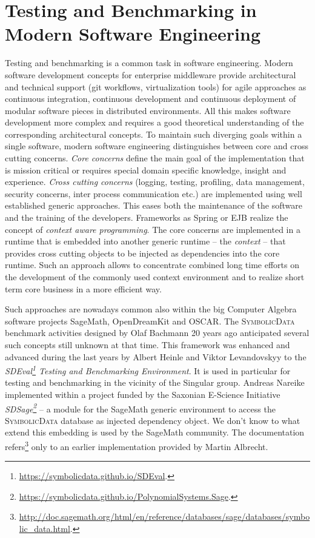 \documentclass[a4paper,11pt]{article}
\def\SD{\textsc{SymbolicData}}
\begin{document}
\section{Testing and Benchmarking in Modern Software Engineering}

Testing and benchmarking is a common task in software engineering. Modern
software development concepts for enterprise middleware provide architectural
and technical support (git workflows, virtualization tools) for agile
approaches as continuous integration, continuous development and continuous
deployment of modular software pieces in distributed environments.  All this
makes software development more complex and requires a good theoretical
understanding of the corresponding architectural concepts.  To maintain such
diverging goals within a single software, modern software engineering
distinguishes between core and cross cutting concerns. \emph{Core concerns}
define the main goal of the implementation that is mission critical or requires
special domain specific knowledge, insight and experience. \emph{Cross cutting
  concerns} (logging, testing, profiling, data management, security concerns,
inter process communication etc.) are implemented using well established generic
approaches.  This eases both the maintenance of the software and the training
of the developers. Frameworks as Spring or EJB realize the concept of
\emph{context aware programming}.  The core concerns are implemented in a
runtime that is embedded into another generic runtime -- the \emph{context} --
that provides cross cutting objects to be injected as dependencies into the
core runtime.  Such an approach allows to concentrate combined long time
efforts on the development of the commonly used context environment and to
realize short term core business in a more efficient way.

Such approaches are nowadays common also within the big Computer Algebra
software projects SageMath, OpenDreamKit and OSCAR. The {\SD} benchmark
activities designed by Olaf Bachmann 20 years ago anticipated several such
concepts still unknown at that time.  This framework was enhanced and advanced
during the last years by Albert Heinle and Viktor Levandovskyy to the
\emph{SDEval\footnote{\url{https://symbolicdata.github.io/SDEval}.}  Testing
  and Benchmarking Environment}.  It is used in particular for testing and
benchmarking in the vicinity of the Singular group.  Andreas Nareike
implemented within a project funded by the Saxonian E-Science Initiative
\emph{SDSage\footnote{\url{https://symbolicdata.github.io/PolynomialSystems.Sage}.}}
-- a module for the SageMath \cite{sagemath} generic environment to access the
{\SD} database as injected dependency object.  We don't know to what extend
this embedding is used by the SageMath community. The documentation
refers\footnote{\url{http://doc.sagemath.org/html/en/reference/databases/sage/databases/symbolic_data.html}.}
only to an earlier implementation provided by Martin Albrecht.
\end{document}
